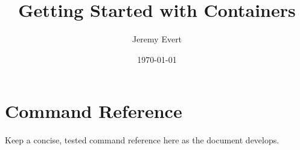 \documentclass[11pt,oneside]{book}
\title{Getting Started with Containers}
\author{Jeremy Evert}
\date{\today}
\begin{document}
\frontmatter
\maketitle
\tableofcontents

\mainmatter











\backmatter
\chapter*{Command Reference}
Keep a concise, tested command reference here as the document develops.
\end{document}
